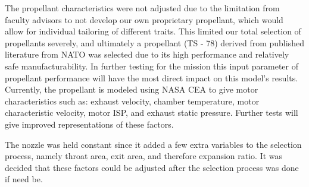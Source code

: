 The propellant characteristics were not adjusted due to the limitation from faculty advisors to not develop our own proprietary propellant, which would allow for individual tailoring of different traits. This limited our total selection of propellants severely, and ultimately a propellant (TS - 78) derived from published literature from NATO was  selected due to its high performance and relatively safe manufacturability. In further testing for the mission this input parameter of propellant performance will have the most direct impact on this model’s results. Currently, the propellant is modeled using NASA CEA to give motor characteristics such as: exhaust velocity, chamber temperature, motor characteristic velocity, motor ISP, and exhaust static pressure. Further tests will give improved representations of these factors.

The nozzle was held constant since it added a few extra variables to the selection process, namely throat area, exit area, and therefore expansion ratio. It was decided that these factors could be adjusted after the selection process was done if need be.

